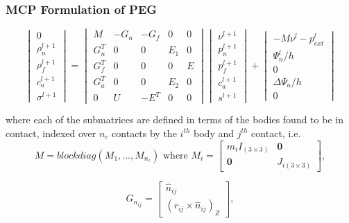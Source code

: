 \documentclass{article}
\begin{document}
\subsubsection{MCP Formulation of PEG}
\begin{equation}
\begin{vmatrix}
0 \\ \rho_{n}^{l+1} \\ \rho_{f}^{l+1} \\ c_{a}^{l+1}  \\ \sigma^{l+1} 
\end{vmatrix} =
\begin{vmatrix} 
M & -G_{n} & -G_{f} & 0 & 0 \\
G_{n}^{T} & 0 & 0 & E_1 & 0 \\
G_{f}^{T} & 0 & 0 & 0 & E \\
G_a^{T} & 0 & 0 & E_2 & 0 \\
0 & U & -E^{T} & 0 & 0 
 \end{vmatrix} 
\begin{vmatrix}
\nu^{l+1} \\
p_{n}^{l+1} \\
p_{f}^{l+1} \\
c_{a}^{l+1} \\
s^{l+1}
\end{vmatrix} + 
\begin{vmatrix}
-M\nu^{l}-p_{ext}^{l} \\
\Psi_{n}^{l}/h \\
0 \\
\Delta \Psi_a / h  \\
0
\end{vmatrix}
\end{equation}


where each of the submatrices are defined in terms of the bodies found to be in contact, indexed over $n_c$ contacts by the $i^{th}$ body and $j^{th}$ contact, i.e.\\
\begin{equation}
M = blockdiag(M_1,...,M_{n_c})
\text{ where } 
M_i = \begin{bmatrix} m_iI_{(3\times3)} & \mathbf{0} \\ \mathbf{0} & J_{i (3\times3)}  \end{bmatrix}, 
\nonumber
\end{equation}


\begin{equation}
G_{n_{ij}} = \begin{bmatrix} 
\hat{n}_{ij}  \\ 
(r_{ij} \times \hat{n}_{ij})_{Z}
\end{bmatrix},  \nonumber
\end{equation}
\end{document}
